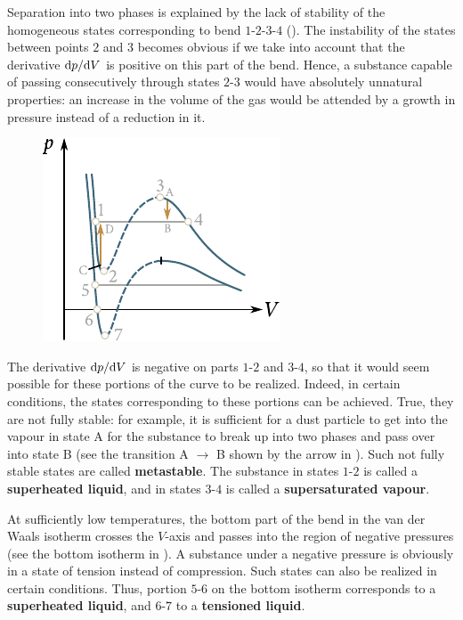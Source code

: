 Separation into two phases is explained by the lack of stability of the homogeneous states corresponding to bend $1$-$2$-$3$-$4$ (). The instability of the states between points $2$ and $3$ becomes obvious if we take into account that the derivative $\mathrm{d} p/\mathrm{d} V$ is positive on this part of the bend. Hence, a substance capable of passing consecutively through states $2$-$3$ would have absolutely unnatural properties: an increase in the volume of the gas would be attended by a growth in pressure instead of a reduction in it.

\begin{figure}[t]
	\begin{center}
		\includegraphics[scale=1]{figures/ch_15/fig_15_10.pdf}
		\caption[]{}
		\label{fig:15_10}
	\end{center}
	\vspace{-0.8cm}
\end{figure}

The derivative $\mathrm{d} p/\mathrm{d} V$ is negative on parts $1$-$2$ and $3$-$4$, so that it would seem possible for these portions of the curve to be realized. Indeed, in certain conditions, the states corresponding to these portions can be achieved. True, they are not fully stable: for example, it is sufficient for a dust particle to get into the vapour in state A for the substance to break up into two phases and pass over into
state B (see the transition A $\to$ B shown by the arrow in ). Such not fully stable states are called \textbf{metastable}. The substance in states $1$-$2$ is called a \textbf{superheated liquid}, and in states $3$-$4$ is called a \textbf{supersaturated vapour}.

At sufficiently low temperatures, the bottom part of the bend in the van der Waals isotherm crosses the $V$-axis and passes into the region of negative pressures (see the bottom isotherm in ). A substance under a negative pressure is obviously in a state of tension instead of compression. Such states can also be realized in certain conditions. Thus, portion $5$-$6$ on the bottom isotherm corresponds to a \textbf{superheated liquid}, and $6$-$7$ to a \textbf{tensioned liquid}.

